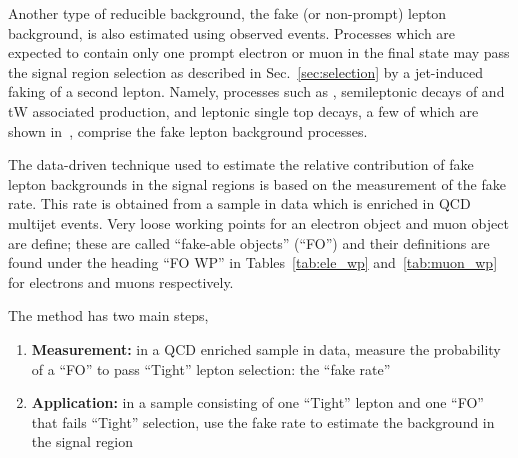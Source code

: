 Another type of reducible background, the fake (or non-prompt) lepton background, is also estimated using observed events. Processes which are expected to contain only one prompt electron or muon in the final state may pass the signal region selection as described in Sec.~\ref{sec:selection} by a jet-induced faking of a second lepton. Namely, processes such as \Wjets, semileptonic decays of \ttbar and tW associated production, and leptonic single top decays, a few of which are shown in~, comprise the fake lepton background processes. 

The data-driven technique used to estimate the relative contribution of fake lepton backgrounds in the signal regions is based on the measurement of the fake rate. This rate is obtained from a sample in data which is enriched in QCD multijet events. Very loose working points for an electron object and muon object are define; these are called ``fake-able objects'' (``FO'') and their definitions are found under the heading ``FO WP'' in Tables~\ref{tab:ele_wp} and~\ref{tab:muon_wp} for electrons and muons respectively.

The method has two main steps,
\begin{enumerate}
\item \textbf{Measurement:} in a QCD enriched sample in data, measure the probability of a ``FO'' to pass ``Tight'' lepton selection: the ``fake rate''
\item \textbf{Application:} in a sample consisting of one ``Tight'' lepton and one ``FO'' that fails ``Tight'' selection, use the fake rate to estimate the background in the signal region
\end{enumerate}

